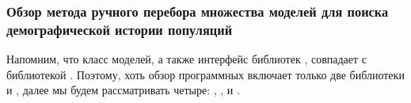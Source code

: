 \documentclass[a4paper,14pt,oneside,openany,article]{memoir}
\begin{document}

\subsubsection*{Обзор метода ручного перебора множества моделей для поиска демографической истории популяций}
Напомним, что класс моделей, а также интерфейс библиотек \moments, \momentsLD совпадает с библиотекой \dadi.
Поэтому, хоть обзор программных включает только две библиотеки  \dadi и \momi, далее мы будем рассматривать четыре: \dadi, \moments, \momentsLD и \momi.
\end{document}
